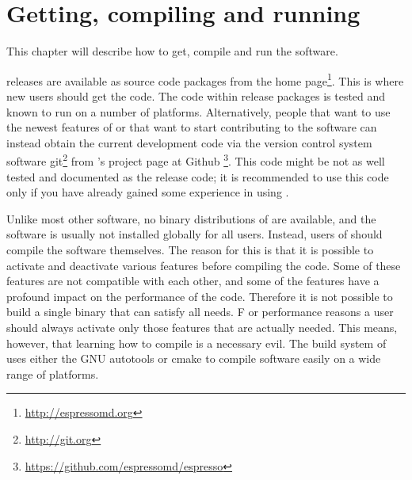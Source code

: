 %  
%   
%  
%  
%
\chapter{Getting, compiling and running \es}
\label{chap:install}

This chapter will describe how to get, compile and run the \es
software.  

\es releases are available as source code packages from the \es home
page\footnote{\url{http://espressomd.org}}.  This is where new users
should get the code.  The code within release packages is tested and
known to run on a number of platforms.  Alternatively, people that
want to use the newest features of \es or that want to start
contributing to the software can instead obtain the current
development code via the version control system software
\textsf{git}\footnote{\url{http://git.org}} from \es's project page at
Github \footnote{\url{https://github.com/espressomd/espresso}}.
This code might be not as well tested and documented as the release
code; it is recommended to use this code only if you have already
gained some experience in using \es.

Unlike most other software, no binary distributions of \es are
available, and the software is usually not installed globally for all
users.  Instead, users of \es should compile the software themselves.
 The reason for this is that it is possible to
activate and deactivate various features before compiling the code.
Some of these features are not compatible with each other, and some of
the features have a profound impact on the performance of the code.
Therefore it is not possible to build a single binary that can satisfy
all needs.  F or performance reasons a user should always activate only those features that are
actually needed.  This means, however, that learning how to compile
\es is a necessary evil.  
The build system of \es uses either the GNU
autotools or cmake to
compile software easily on a wide range of platforms.

